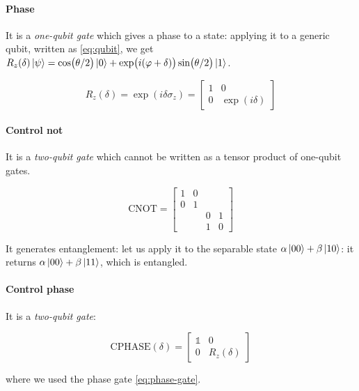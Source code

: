 \documentclass[main.tex]{subfiles}
\begin{document}
\paragraph{Phase}
It is a \emph{one-qubit gate} which  gives a phase to a state: applying it to a generic qubit, written as \eqref{eq:qubit}, we get \(R_z(\delta) \ket{\psi} =  \cos(\theta/2) \ket{0} + \exp(i(\varphi+\delta)) \sin(\theta/2)\ket{1}\).

\begin{equation} \label{eq:phase-gate}
    R_z (\delta) = \exp(i \delta \sigma_z) = \begin{bmatrix}
    1   & 0 \\
    0   & \exp(i \delta)
\end{bmatrix}
\end{equation}

\paragraph{Control not} \label{par:cnot}
It is a \emph{two-qubit gate}  which cannot be written as a tensor product of one-qubit gates.

\begin{equation}
    \text{CNOT} = \begin{bmatrix}
    1   &  0 &   &  \\
      0 & 1  &   &  \\
       &   & 0  & 1 \\
       &   & 1  & 0
   \end{bmatrix}
\end{equation}

It generates entanglement: let us apply it to the separable state \(\alpha \ket{00} + \beta \ket{10} \): it returns \(\alpha \ket{00} + \beta \ket{11} \), which is entangled.

\paragraph{Control phase}

It is a \emph{two-qubit gate}:

\begin{equation}
    \text{CPHASE}(\delta) = \begin{bmatrix}
    \mathbb 1   & 0 \\
    0   & R_z(\delta)
\end{bmatrix}
\end{equation}

where we used the phase gate \eqref{eq:phase-gate}.
\end{document}
